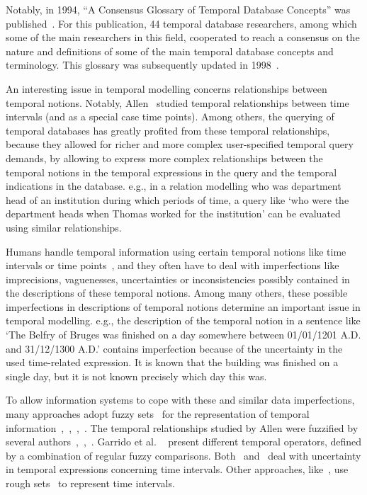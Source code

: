 Notably, in 1994, ``A Consensus Glossary of Temporal Database Concepts'' was published~\cite{Dyreson1994}. For this publication, 44 temporal database researchers, among which some of the main researchers in this field, cooperated to reach a consensus on the nature and definitions of some of the main temporal database concepts and terminology. This glossary was subsequently updated in 1998~\cite{Dyreson1998}.

An interesting issue in temporal modelling concerns relationships between temporal notions. Notably, Allen~\cite{Allen1983} studied temporal relationships between time intervals (and as a special case time points). Among others, the querying of temporal databases has greatly profited from these temporal relationships, because they allowed for richer and more complex user-specified temporal query demands, by allowing to express more complex relationships between the temporal notions in the temporal expressions in the query and the temporal indications in the database. e.g., in a relation modelling who was department head of an institution during which periods of time, a query like `who were the department heads when Thomas worked for the institution' can be evaluated using similar relationships.

Humans handle temporal information using certain temporal notions like time intervals or time points~\cite{Dyreson1994}, and they often have to deal with imperfections like imprecisions, vaguenesses, uncertainties or inconsistencies possibly contained in the descriptions of these temporal notions. Among many others, these possible imperfections in descriptions of temporal notions determine an important issue in temporal modelling. e.g., the description of the temporal notion in a sentence like `The Belfry of Bruges was finished on a day somewhere between 01/01/1201 A.D. and 31/12/1300 A.D.' contains imperfection because of the uncertainty in the used time-related expression. It is known that the building was finished on a single day, but it is not known precisely which day this was.

To allow information systems to cope with these and similar data imperfections, many approaches adopt fuzzy sets~\cite{Zadeh1965} for the representation of temporal information~\cite{Mitra1994},~\cite{Nagypal2003},~\cite{Billiet2011},~\cite{Dubois2003}. The temporal relationships studied by Allen were fuzzified by several authors~\cite{Ohlbach2004},~\cite{Nagypal2003},~\cite{Schockaert2008}. Garrido et al. ~\cite{Garrido2009} present different temporal operators, defined by a combination of regular fuzzy comparisons. Both~\cite{Garrido2009} and~\cite{Pons2011} deal with uncertainty in temporal expressions concerning time intervals. Other approaches, like~\cite{Qiang2009}, use rough sets~\cite{Pawlak1995} to represent time intervals.

